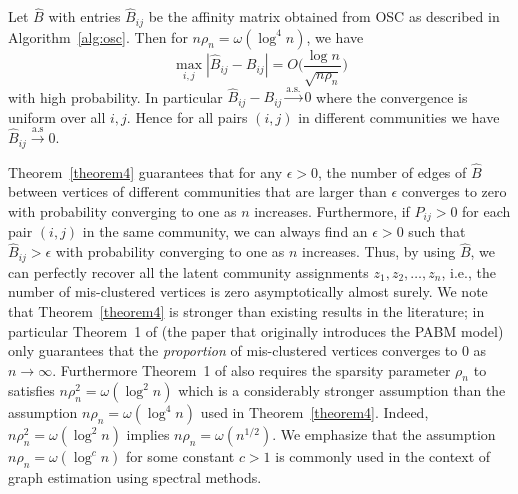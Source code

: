 \documentclass[12pt]{article}
\begin{document}
\begin{theorem}
\label{theorem4}
Let $\hat{B}$ with entries $\hat{B}_{ij}$ be the affinity matrix
obtained from OSC as described in Algorithm~\ref{alg:osc}. Then for $n \rho_n = \omega(\log^{4}{n})$, we have
\begin{equation} \label{eq:thm4a}
\max_{i, j} |\hat{B}_{ij} - B_{ij}| = O\Big( \frac{\log n}{\sqrt{n \rho_n}} \Big)
\end{equation}
with high probability. In particular $\hat{B}_{ij} -
B_{ij} \overset{\mathrm{a.s.}}{\rightarrow} 0$ where the convergence is
uniform over all $i,j$. Hence for all pairs $(i,j)$ in different
communities we have
$\hat{B}_{ij} \overset{\mathrm{a.s}}{\rightarrow} 0$. 
\end{theorem}
Theorem~\ref{theorem4} guarantees that for any $\epsilon > 0$, 
the number of edges of $\hat{B}$ between vertices of different communities 
that are larger than $\epsilon$ converges to zero with probability
converging to one as $n$ increases. 
Furthermore, if $P_{ij} > 0$ for each pair $(i, j)$ in the same community, 
we can always find an $\epsilon > 0$ such that $\hat{B}_{ij} > \epsilon$ 
with probability converging to one as $n$ increases. 
Thus, by using $\hat{B}$, we can 
perfectly recover all the latent community assignments $z_1, z_2,
\dots, z_n$, i.e., the number of mis-clustered vertices is zero
asymptotically almost surely. We note that Theorem~\ref{theorem4} is
stronger than existing results in the literature; in particular
Theorem~1 of \citet{307cbeb9b1be48299388437423d94bf1} (the paper that
originally introduces the PABM model) only guarantees that the {\em
  proportion} of mis-clustered vertices converges to $0$ as $n
\rightarrow \infty$. Furthermore Theorem~1
of \citet{307cbeb9b1be48299388437423d94bf1} also requires the sparsity
parameter $\rho_n$ to satisfies $n \rho_n^2 = \omega(\log^2{n})$ which
is a considerably stronger assumption than the assumption $n \rho_n =
\omega(\log^{4}{n})$ used in Theorem~\ref{theorem4}. Indeed, $n
\rho_n^2 = \omega(\log^{2}{n})$ implies $n \rho_n = \omega(n^{1/2})$. 
We emphasize that the assumption $n \rho_n = \omega(\log^{c}{n})$ for
some constant $c > 1$ is commonly used in the context of graph
estimation using spectral methods.
\end{document}
